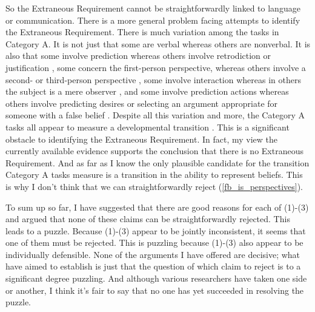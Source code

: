 \documentclass[12pt,\papersize]{extarticle}
\begin{document}
So the Extraneous Requirement cannot be straightforwardly linked to language or communication.
There is a more general problem facing attempts to identify the Extraneous Requirement.
There is much variation among the tasks in Category A.
It is not just that some are verbal whereas others are nonverbal.
It is also that some involve prediction whereas others involve retrodiction or justification \citep[e.g.][]{Wimmer:1998kx},
some concern the first-person perspective, whereas others involve a second- or third-person perspective \citep[e.g.][]{Gopnik:1991db},
some involve interaction whereas in others the subject is a mere observer \citep[e.g.][]{Chandler:1989qa},
and some involve prediction actions whereas others involve predicting desires \citep{Astington:1991kk} or selecting an argument appropriate for someone with a false belief \citep{Bartsch:2000es}.
Despite all this variation and more, the Category A tasks all appear to measure a developmental transition \citep{Wellman:2001lz}.
This is a significant obstacle to identifying the Extraneous Requirement.
In fact, my view the currently available evidence supports the conclusion that there is no Extraneous Requirement.
And as far as I know the only plausible candidate for the transition  Category A tasks measure is a transition in the ability to represent beliefs.
This is why I don't think that we can straightforwardly reject  (\ref{fb_is_perspectives}).

To sum up so far, 
I have suggested that there are good reasons for each of (1)-(3) and 
argued that none of these claims can be straightforwardly rejected.
This leads to a puzzle.
Because (1)-(3) appear to be jointly inconsistent, it seems that one of them must be rejected.
This is puzzling because (1)-(3) also appear to be individually defensible.
None of the arguments I have offered are decisive; what have aimed to establish is just that the question of which claim to reject is to a significant degree puzzling.
And although various researchers have taken one side or another,
I think it's fair to say that no one has yet succeeded in resolving the puzzle.
\end{document}
